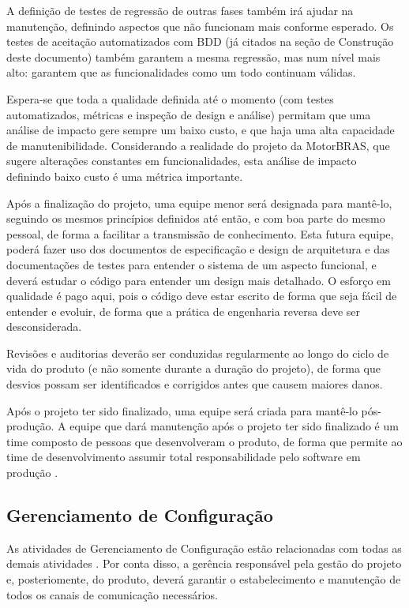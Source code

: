 \documentclass[12pt,journal,compsoc]{IEEEtran}
\begin{document}
A definição de testes de regressão de outras fases também irá ajudar na manutenção, definindo aspectos que não funcionam mais conforme esperado. Os testes de aceitação automatizados com BDD (já citados na seção de Construção deste documento) também garantem a mesma regressão, mas num nível mais alto: garantem que as funcionalidades como um todo continuam válidas. 

Espera-se que toda a qualidade definida até o momento (com testes automatizados, métricas e inspeção de design e análise) permitam que uma análise de impacto gere sempre um baixo custo, e que haja uma alta capacidade de manutenibilidade. Considerando a realidade do projeto da MotorBRAS, que sugere alterações constantes em funcionalidades, esta análise de impacto definindo baixo custo é uma métrica importante.

Após a finalização do projeto, uma equipe menor será designada para mantê-lo, seguindo os mesmos princípios definidos até então, e com boa parte do mesmo pessoal, de forma a facilitar a transmissão de conhecimento. Esta futura equipe, poderá fazer uso dos documentos de especificação e design de arquitetura e das documentações de testes para entender o sistema de um aspecto funcional, e deverá estudar o código para entender um design mais detalhado. O esforço em qualidade é pago aqui, pois o código deve estar escrito de forma que seja fácil de entender e evoluir, de forma que a prática de engenharia reversa deve ser desconsiderada. 

Revisões e auditorias \cite{society_software_2004} deverão ser conduzidas regularmente ao longo do ciclo de vida do produto (e não somente durante a
duração do projeto), de forma que desvios possam ser identificados e corrigidos antes que causem maiores danos.

Após o projeto ter sido finalizado, uma equipe será criada para mantê-lo pós-produção. A equipe que dará manutenção após o projeto ter sido finalizado é um time composto de pessoas que desenvolveram o produto, de forma que permite ao time de desenvolvimento assumir total responsabilidade pelo software em produção \cite{fowler_products_not_projects}. 


\subsection{Gerenciamento de Configuração}

As atividades de Gerenciamento de Configuração estão relacionadas com todas
as demais atividades \cite{society_software_2004}. Por conta disso, a gerência
responsável pela gestão do projeto e, posteriomente, do produto, deverá
garantir o estabelecimento e manutenção de todos os canais de comunicação
necessários.
\end{document}
